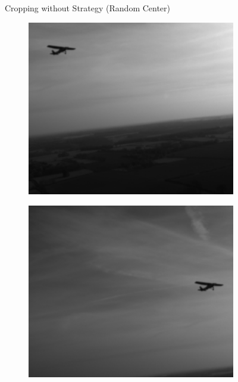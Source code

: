 {\begin{figure}[p]
  \caption{Cropping without Strategy (Random Center)}
  \label{fig:crop-illegal}
\end{figure}
\begin{figure}[p]
  \centering
  \begin{subfigure}[][][t]{0.3\textwidth}
      \includegraphics[width=1\linewidth]{figures/crop_strat_legal1.png}
  \end{subfigure}\hfill
  \begin{subfigure}[][][t]{0.3\textwidth}
      \includegraphics[width=1\linewidth]{figures/crop_strat_legal2.png}

\end{subfigure}
\end{figure}}
